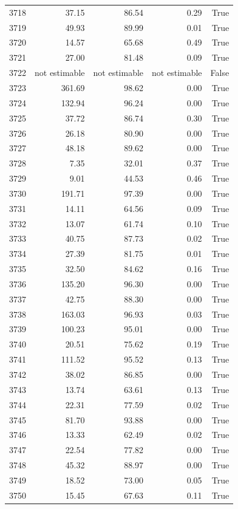 \begin{longtable}{rrrrr}
3718 & 37.15 & 86.54 & 0.29 & True \\
3719 & 49.93 & 89.99 & 0.01 & True \\
3720 & 14.57 & 65.68 & 0.49 & True \\
3721 & 27.00 & 81.48 & 0.09 & True \\
3722 & not estimable & not estimable & not estimable & False \\
3723 & 361.69 & 98.62 & 0.00 & True \\
3724 & 132.94 & 96.24 & 0.00 & True \\
3725 & 37.72 & 86.74 & 0.30 & True \\
3726 & 26.18 & 80.90 & 0.00 & True \\
3727 & 48.18 & 89.62 & 0.00 & True \\
3728 & 7.35 & 32.01 & 0.37 & True \\
3729 & 9.01 & 44.53 & 0.46 & True \\
3730 & 191.71 & 97.39 & 0.00 & True \\
3731 & 14.11 & 64.56 & 0.09 & True \\
3732 & 13.07 & 61.74 & 0.10 & True \\
3733 & 40.75 & 87.73 & 0.02 & True \\
3734 & 27.39 & 81.75 & 0.01 & True \\
3735 & 32.50 & 84.62 & 0.16 & True \\
3736 & 135.20 & 96.30 & 0.00 & True \\
3737 & 42.75 & 88.30 & 0.00 & True \\
3738 & 163.03 & 96.93 & 0.03 & True \\
3739 & 100.23 & 95.01 & 0.00 & True \\
3740 & 20.51 & 75.62 & 0.19 & True \\
3741 & 111.52 & 95.52 & 0.13 & True \\
3742 & 38.02 & 86.85 & 0.00 & True \\
3743 & 13.74 & 63.61 & 0.13 & True \\
3744 & 22.31 & 77.59 & 0.02 & True \\
3745 & 81.70 & 93.88 & 0.00 & True \\
3746 & 13.33 & 62.49 & 0.02 & True \\
3747 & 22.54 & 77.82 & 0.00 & True \\
3748 & 45.32 & 88.97 & 0.00 & True \\
3749 & 18.52 & 73.00 & 0.05 & True \\
3750 & 15.45 & 67.63 & 0.11 & True \\

\end{longtable}
